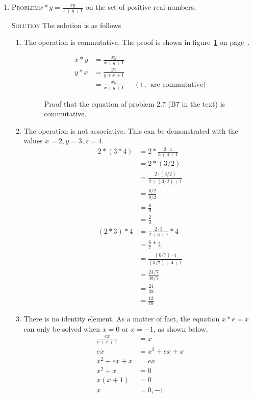 \documentclass[draft,twoside]{amsart}
\newcommand{\Solution}{\textsc{Solution}\xspace}
\newcommand{\Problem}{\textsc{Problem}\xspace}
\begin{document}
\begin{enumerate}
   \item \Problem $\displaystyle x * y = \frac{xy}{x + y + 1}$ on the set of
   positive real numbers.

   \noindent \Solution The solution is as follows
   \begin{enumerate}
      \item The operation is commutative. The proof is shown in 
      figure~\ref{fig:b7_com} on page~\pageref{fig:b7_com}.

      \begin{figure}
      \caption{Proof that the equation of problem 2.7 (B7 in the text) 
      is commutative.}
      \label{fig:b7_com}
      \begin{align*}
         x * y & = \frac{xy}{x + y + 1} \\
	 y * x & = \frac{yx}{y + x + 1} \\
	       & = \frac{xy}{x + y + 1} && \text{(+,$\cdot$ are commutative)}
      \end{align*}
      \end{figure}

      \item The operation is not associative. This can be demonstrated 
      with the values $x = 2, y = 3, z = 4$.
      \begin{align*}
         2 * (3 * 4) & = 2 * \frac{3 \cdot 4}{3 + 4 + 1}   \\
	             & = 2 * (3/2) \\
		     & = \frac{2 \cdot (3/2)}{2 + (3/2) + 1} \\
		     & = \frac{6/2}{9/2} \\
		     & = \frac{6}{9} \\
		     & = \frac{2}{3} \\
	 (2 * 3) * 4 & = \frac{2 \cdot 3}{2 + 3 + 1} * 4 \\
	             & = \frac{6}{7} * 4 \\
		     & = \frac{(6/7) \cdot 4}{(3/7) + 4 + 1} \\
		     & = \frac{24/7}{38/7} \\
		     & = \frac{24}{38} \\
		     & = \frac{12}{19}
      \end{align*}

      \item There is no identity element. As a matter of fact,
      the equation $x * e = x$ can only be solved when $x = 0$ or $x = -1$, as 
      shown below.
      \begin{align*}
         \frac{ex}{e + x + 1} & = x \\
	 ex                   & = x^2 + ex + x \\
	 x^2 + ex + x         & = ex \\
	 x^2 + x              & = 0 \\
	 x(x+1)               & = 0 \\
	 x                    & = 0, -1
      \end{align*}


\end{enumerate}
\end{enumerate}
\end{document}
